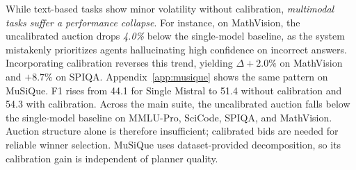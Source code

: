 \documentclass[11pt]{article}
\begin{document}
\begin{table}[t]
    \centering
    \caption{Ablation study of calibration impact on downstream accuracy (\%). We compare the Vanilla strong baseline against our Auction mechanism with and without calibration. Values in parentheses denote the absolute performance gain/loss ($\Delta$) relative to the Vanilla baseline. \textit{Note}: For SPIQA, accuracy is reported on the strict subset where L3 Score $\ge$ 0.8.}
    \label{tab:calibration_ablation}
\end{table}

While text-based tasks show minor volatility without calibration, \emph{multimodal tasks suffer a performance collapse}. 
For instance, on MathVision, the uncalibrated auction drops \emph{4.0\%} below the single-model baseline, as the system mistakenly prioritizes agents hallucinating high confidence on incorrect answers.
Incorporating calibration reverses this trend, yielding $\Delta +2.0\%$ on MathVision and $+8.7\%$ on SPIQA.
Appendix~\ref{app:musique} shows the same pattern on MuSiQue. F1 rises from 44.1 for Single Mistral to 51.4 without calibration and 54.3 with calibration.
Across the main suite, the uncalibrated auction falls below the single-model baseline on MMLU-Pro, SciCode, SPIQA, and MathVision.
Auction structure alone is therefore insufficient; calibrated bids are needed for reliable winner selection.
MuSiQue uses dataset-provided decomposition, so its calibration gain is independent of planner quality.
\end{document}
